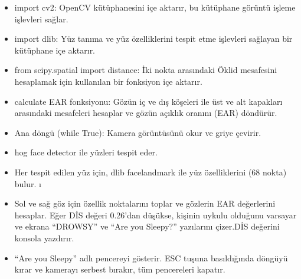 \documentclass[12pt, a4paper]{article}
\begin{document}
 	\begin{itemize}
 		\item import cv2: OpenCV kütüphanesini içe aktarır, bu kütüphane görüntü işleme işlevleri sağlar.
 		\item import dlib: Yüz tanıma ve yüz özelliklerini tespit etme işlevleri sağlayan bir kütüphane içe aktarır.
 		\item from scipy.spatial import distance: İki nokta arasındaki Öklid mesafesini hesaplamak için kullanılan bir fonksiyon içe aktarır.
 		\item calculate EAR fonksiyonu: Gözün iç ve dış köşeleri ile üst ve alt kapakları arasındaki mesafeleri hesaplar ve gözün açıklık oranını (EAR) döndürür.
 		\item Ana döngü (while True): Kamera görüntüsünü okur ve griye çevirir.
 		\item hog face detector ile yüzleri tespit eder.\item Her tespit edilen yüz için, dlib facelandmark ile yüz özelliklerini (68 nokta) bulur. ı\item Sol ve sağ göz için özellik noktalarını toplar ve gözlerin EAR değerlerini hesaplar. Eğer DİS değeri 0.26’dan düşükse, kişinin uykulu olduğunu varsayar ve ekrana “DROWSY” ve “Are you Sleepy?” yazılarını çizer.DİS değerini konsola yazdırır.\item “Are you Sleepy” adlı pencereyi gösterir. ESC tuşuna basıldığında döngüyü kırar ve kamerayı serbest bırakır, tüm pencereleri kapatır.
 	  
 	\end{itemize} 
\end{document}
